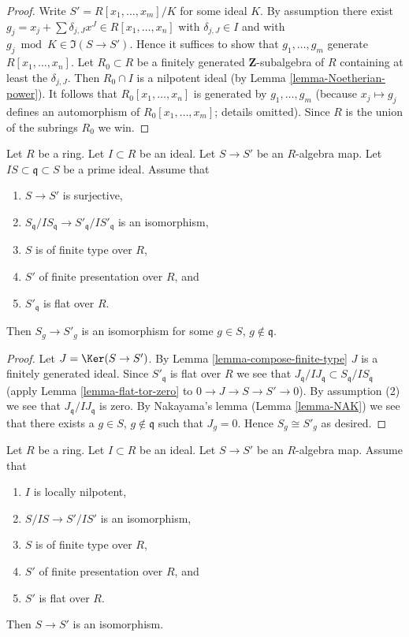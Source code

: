 \begin{proof}
Write $S' = R[x_1, \ldots, x_m]/K$ for some ideal $K$. By assumption there
exist $g_j = x_j + \sum \delta_{j, J} x^J \in R[x_1, \ldots, x_n]$ with
$\delta_{j, J} \in I$ and with $g_j \bmod K \in \Im(S \to S')$.
Hence it suffices to show that $g_1, \ldots, g_m$ generate
$R[x_1, \ldots, x_n]$. Let $R_0 \subset R$ be a finitely generated
$\mathbf{Z}$-subalgebra of $R$ containing at least the $\delta_{j, J}$.
Then $R_0 \cap I$ is a nilpotent ideal (by
Lemma \ref{lemma-Noetherian-power}). It follows that
$R_0[x_1, \ldots, x_n]$ is generated by $g_1, \ldots, g_m$ (because
$x_j \mapsto g_j$ defines an automorphism of $R_0[x_1, \ldots, x_m]$;
details omitted). Since $R$ is the union of the subrings $R_0$ we win.
\end{proof}

\begin{lemma}
\label{lemma-isomorphism-modulo-ideal}
Let $R$ be a ring. Let $I \subset R$ be an ideal. Let $S \to S'$
be an $R$-algebra map. Let $IS \subset \mathfrak q \subset S$
be a prime
ideal. Assume that
\begin{enumerate}
\item $S \to S'$ is surjective,
\item $S_\mathfrak q/IS_\mathfrak q \to S'_\mathfrak q/IS'_\mathfrak q$
is an isomorphism,
\item $S$ is of finite type over $R$,
\item $S'$ of finite presentation over $R$, and
\item $S'_\mathfrak q$ is flat over $R$.
\end{enumerate}
Then $S_g \to S'_g$ is an isomorphism for some
$g \in S$, $g \not \in \mathfrak q$.
\end{lemma}

\begin{proof}
Let $J = \Ker(S \to S')$. By
Lemma \ref{lemma-compose-finite-type}
$J$ is a finitely generated ideal. Since $S'_\mathfrak q$ is flat
over $R$ we see that
$J_\mathfrak q/IJ_\mathfrak q \subset S_\mathfrak q/IS_{\mathfrak q}$
(apply Lemma \ref{lemma-flat-tor-zero} to $0 \to J \to S \to S' \to 0$).
By assumption (2) we see that $J_\mathfrak q/IJ_\mathfrak q$ is zero.
By Nakayama's lemma (Lemma \ref{lemma-NAK}) we see that
there exists a $g \in S$, $g \not \in \mathfrak q$ such
that $J_g = 0$. Hence $S_g \cong S'_g$ as desired.
\end{proof}

\begin{lemma}
\label{lemma-isomorphism-modulo-locally-nilpotent}
Let $R$ be a ring. Let $I \subset R$ be an ideal. Let $S \to S'$
be an $R$-algebra map. Assume that
\begin{enumerate}
\item $I$ is locally nilpotent,
\item $S/IS \to S'/IS'$ is an isomorphism,
\item $S$ is of finite type over $R$,
\item $S'$ of finite presentation over $R$, and
\item $S'$ is flat over $R$.
\end{enumerate}
Then $S \to S'$ is an isomorphism.
\end{lemma}

